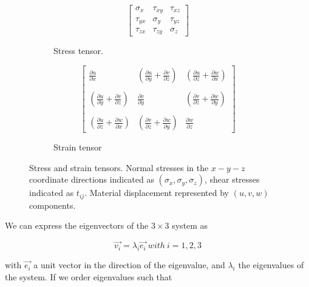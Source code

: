\begin{figure}[htb]
	\begin{subfigure}[h]{0.48\linewidth}
		\Large
		\begin{equation*}
		\left[\begin{array}{ccc}
		\sigma{_x} & \tau{_{xy}} & \tau{_{xz}}  \\
		\tau{_{yx}} & \sigma{_y} & \tau{_{yz}}    \\
		\tau{_{zx}} & \tau{_{zy}} & \sigma{_z}
		\end{array}\right]
		\end{equation*}
		\caption{Stress tensor.}
		\label{fig:Figure6-20a}
	\end{subfigure}
	\hfill
	\begin{subfigure}[h]{0.48\linewidth}
		\Large
		\begin{equation*}
		\left[\begin{array}{ccc}
		\frac{\partial u}{\partial x} & (\frac{\partial u}{\partial y} + \frac{\partial v}{\partial z})&   (\frac{\partial u}{\partial z} + \frac{\partial w}{\partial x})\\ \\
		(\frac{\partial u}{\partial y} + \frac{\partial v}{\partial z}) & \frac{\partial v}{\partial y} & (\frac{\partial v}{\partial z} + \frac{\partial w}{\partial y})    \\ \\
		(\frac{\partial u}{\partial z} + \frac{\partial w}{\partial x}) & (\frac{\partial v}{\partial z} + \frac{\partial w}{\partial y})&
		\frac{\partial w}{\partial z}
		\end{array}\right]
		\end{equation*}
		\caption{Strain tensor}\label{fig:Figure6-20b}
	\end{subfigure}
	\caption{Stress and strain tensors. Normal stresses in the $x-y-z$ coordinate directions indicated as $(\sigma_x, \sigma_y, \sigma_z)$, shear stresses indicated as $t_{ij}$. Material displacement represented by $(u, v, w)$ components.}\label{fig:Figure6-20}
\end{figure}


We can express the eigenvectors of the $3 \times 3$ system as

\begin{equation}\label{eq:6.8}
\vec{v_i} = \lambda _i \vec{e_i} \ with\  i = 1,2,3
\end{equation}

with $\vec{e_i}$ a unit vector in the direction of the eigenvalue, and $\lambda{_i}$ the eigenvalues of the system. If we order eigenvalues such that

